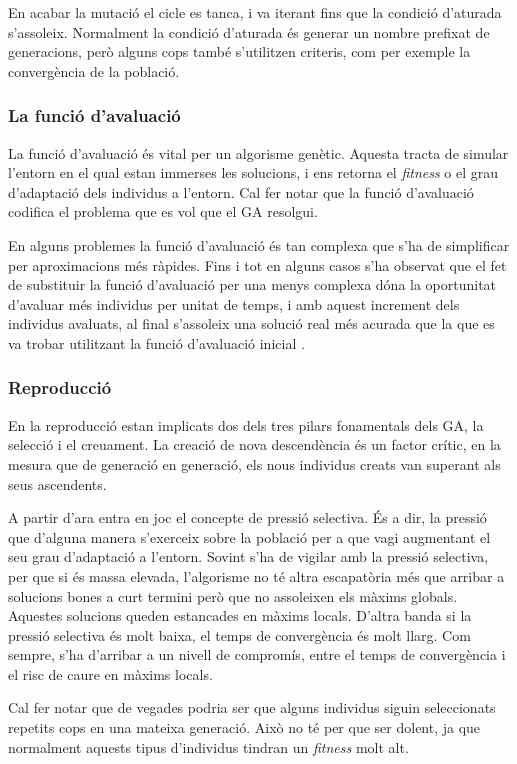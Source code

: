 \documentclass[titlepage,a4paper,12pt]{book}
\begin{document}
En acabar la mutació el cicle es tanca, i va iterant fins que la condició
d'aturada s'assoleix. Normalment la condició d'aturada és generar un nombre
prefixat de generacions, però alguns cops també s'utilitzen criteris, com per
exemple la convergència de la població.

\subsubsection{La funció d'avaluació\label{subsec:avaluacio}} La funció
d'avaluació és vital per un algorisme genètic. Aquesta tracta de simular
l'entorn en el qual estan immerses les solucions, i ens retorna el
\emph{fitness} o el grau d'adaptació dels individus a l'entorn. Cal fer notar
que la funció d'avaluació codifica el problema que es vol que el GA resolgui.

En alguns problemes la funció d'avaluació és tan complexa que s'ha de
simplificar per aproximacions més ràpides. Fins i tot en alguns casos s'ha
observat que el fet de substituir la funció d'avaluació per una menys complexa
dóna la oportunitat d'avaluar més individus per unitat de temps, i amb aquest
increment dels individus avaluats, al final s'assoleix una solució real més
acurada que la que es va trobar utilitzant la funció d'avaluació inicial
\cite{G89}. 

\subsubsection{Reproducció} En la reproducció estan implicats dos dels tres
pilars fonamentals dels GA, la selecció i el creuament. La creació de nova
descendència és un factor crític, en la mesura que de generació en generació,
els nous individus creats van superant als seus ascendents.

A partir d'ara entra en joc el concepte de pressió selectiva. És a dir, la
pressió que d'alguna manera s'exerceix sobre la població per a que vagi
augmentant el seu grau d'adaptació a l'entorn. Sovint s'ha de vigilar amb la
pressió selectiva, per que si és massa elevada, l'algorisme no té altra
escapatòria més que arribar a solucions bones a curt termini però que no
assoleixen els màxims globals. Aquestes solucions queden estancades en màxims
locals. D'altra banda si la pressió selectiva és molt baixa, el temps de
convergència és molt llarg.  Com sempre, s'ha d'arribar a un nivell de
compromís, entre el temps de convergència i el risc de caure en màxims locals.

Cal fer notar que de vegades podria ser que alguns individus siguin seleccionats
repetits cops en una mateixa generació. Això no té per que ser dolent, ja que
normalment aquests tipus d'individus tindran un \emph{fitness} molt alt.
\end{document}
